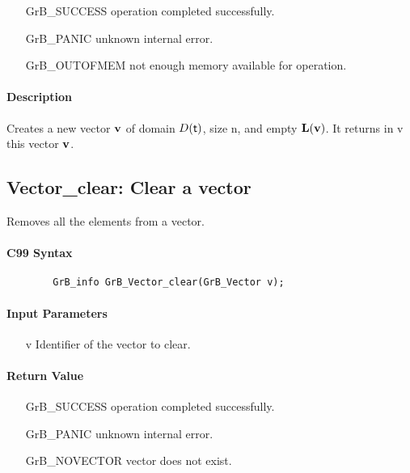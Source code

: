 \begin{itemize}[leftmargin=2.1in]
\item[{\sf GrB\_SUCCESS}]    operation completed successfully. \\
\item[{\sf GrB\_PANIC}]      unknown internal error. \\
\item[{\sf GrB\_OUTOFMEM}]   not enough memory available for operation. \\
\end{itemize}

\paragraph{Description}

Creates a new vector ${\bf v}$ of domain $D({\sf t})$, size {\sf n}, and
empty $\bold{L}({\bf v})$. It returns in {\sf v} this vector ${\bf v}$.

\subsection{{\sf Vector\_clear}: Clear a vector}

Removes all the elements from a vector.

\paragraph{C99 Syntax}

\begin{verbatim}
        GrB_info GrB_Vector_clear(GrB_Vector v);
\end{verbatim}

\paragraph{Input Parameters}

\begin{itemize}[leftmargin=1.1in]
    \item[{\sf v}] Identifier of the vector to clear.
\end{itemize}

\paragraph{Return Value}

\begin{itemize}[leftmargin=2.1in]
\item[{\sf GrB\_SUCCESS}]   operation completed successfully.
\item[{\sf GrB\_PANIC}]     unknown internal error.
\item[{\sf GrB\_NOVECTOR}]  vector does not exist.
\end{itemize}

